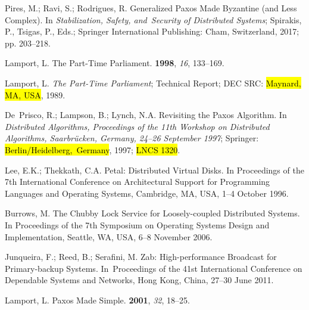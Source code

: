 \documentclass[algorithms,article,accept,moreauthors,pdftex,10pt,a4paper]{Definitions/mdpi}
\begin{document}
\begin{thebibliography}{999}

Pires, M.; Ravi, S.; Rodrigues, R.
\newblock Generalized Paxos Made Byzantine (and Less Complex).
\newblock In \emph{Stabilization, Safety, and~Security of Distributed Systems};
Spirakis, P., Tsigas, P., Eds.; Springer International Publishing: Cham, Switzerland, 
2017; pp. 203--218.

Lamport, L.
\newblock The {Part-Time} Parliament.
 {\bf 1998}, {\em
16}, 133--169.

Lamport, L.
\newblock \emph{The Part-Time Parliament};
\newblock Technical Report; DEC SRC: \hl{Maynard, MA, USA}, 1989.

De~Prisco, R.; Lampson, B.; Lynch, N.A.
\newblock Revisiting the {Paxos} Algorithm.
\newblock In \emph{Distributed Algorithms, Proceedings of the 11th Workshop on Distributed Algorithms, Saarbrücken, Germany, 24--26 September 1997}; Springer: \hl{\mbox{Berlin/Heidelberg, Germany}}, %
1997; \hl{LNCS 1320}. %

Lee, E.K.; Thekkath, C.A.
\newblock Petal: Distributed Virtual Disks.
\newblock In Proceedings of the 7th International Conference on Architectural Support for Programming
Languages and Operating Systems, Cambridge, MA, USA, 1--4 October 1996.

Burrows, M.
\newblock The Chubby Lock Service for Loosely-coupled Distributed Systems.
\newblock In Proceedings of the 7th Symposium on Operating Systems Design and Implementation, Seattle, WA, USA, 6--8 November 2006.

Junqueira, F.; Reed, B.; Serafini, M.
\newblock Zab: High-performance Broadcast for Primary-backup Systems.
\newblock In~Proceedings of the 41st International Conference on Dependable Systems and Networks, Hong Kong, China, 27--30 June 2011.

Lamport, L.
\newblock Paxos Made Simple.
 {\bf 2001}, {\em 32}, 18--25.


\end{thebibliography}
\end{document}
